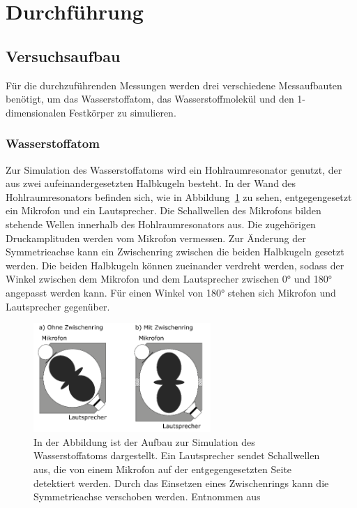 \newpage
\section{Durchführung}
    \subsection{Versuchsaufbau}
        Für die durchzuführenden Messungen werden drei verschiedene Messaufbauten benötigt, um das Wasserstoffatom, das Wasserstoffmolekül und den 1-dimensionalen Festkörper zu simulieren. 
        \FloatBarrier
        \subsubsection*{Wasserstoffatom}
            Zur Simulation des Wasserstoffatoms wird ein Hohlraumresonator genutzt, der aus zwei aufeinandergesetzten Halbkugeln besteht. In der Wand des Hohlraumresonators befinden sich, wie in 
            Abbildung~\ref{fig:atom_Aufbau} zu sehen, entgegengesetzt ein Mikrofon und ein Lautsprecher. Die Schallwellen des Mikrofons bilden stehende Wellen innerhalb des Hohlraumresonators aus. Die 
            zugehörigen Druckamplituden werden vom Mikrofon vermessen. Zur Änderung der Symmetrieachse kann ein Zwischenring zwischen die beiden Halbkugeln gesetzt werden. Die beiden Halbkugeln können 
            zueinander verdreht werden, sodass der Winkel zwischen dem Mikrofon und dem Lautsprecher zwischen 0° und 180° angepasst werden kann. Für einen Winkel von 180° stehen sich Mikrofon und Lautsprecher
            gegenüber. 
            \begin{figure}[h]
              \centering
              \includegraphics[width = 0.6\textwidth]{pictures/aufbau.png}
              \caption{In der Abbildung ist der Aufbau zur Simulation des Wasserstoffatoms dargestellt. Ein Lautsprecher sendet Schallwellen aus, die von einem Mikrofon auf der entgegengesetzten Seite detektiert werden. Durch das Einsetzen eines Zwischenrings kann die Symmetrieachse verschoben werden. Entnommen aus~\cite{tu_dortmund_versuchsanleitung_2021-4}}
              \label{fig:atom_Aufbau}
            \end{figure}

